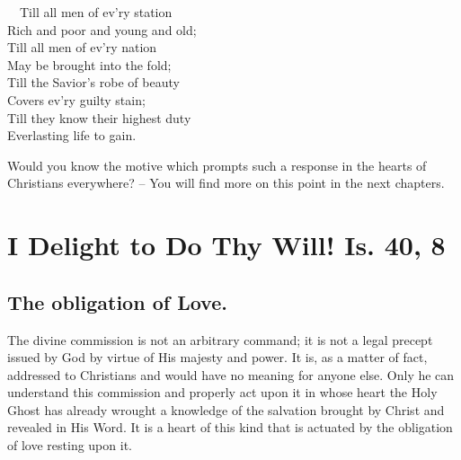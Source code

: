 \documentclass[
]{book}
\begin{document}
~~Till all men of ev'ry station\\
\hspace*{0.333em}\hspace*{0.333em}Rich and poor and young and old;\\
\hspace*{0.333em}\hspace*{0.333em}Till all men of ev'ry nation\\
\hspace*{0.333em}\hspace*{0.333em}May be brought into the fold;\\
\hspace*{0.333em}\hspace*{0.333em}Till the Savior's robe of beauty\\
\hspace*{0.333em}\hspace*{0.333em}Covers ev'ry guilty stain;\\
\hspace*{0.333em}\hspace*{0.333em}Till they know their highest duty\\
\hspace*{0.333em}\hspace*{0.333em}Everlasting life to gain.

Would you know the motive which prompts such a response in the hearts of Christians everywhere? -- You will find more on this point in the next chapters.

\hypertarget{i-delight-to-do-thy-will-is.-40-8}{%
\chapter{I Delight to Do Thy Will! Is. 40, 8}\label{i-delight-to-do-thy-will-is.-40-8}}

\hypertarget{the-obligation-of-love.}{%
\section*{The obligation of Love.}\label{the-obligation-of-love.}}

The divine commission is not an arbitrary command; it is not a legal precept issued by God by virtue of His majesty and power. It is, as a matter of fact, addressed to Christians and would have no meaning for anyone else. Only he can understand this commission and properly act upon it in whose heart the Holy Ghost has already wrought a knowledge of the salvation brought by Christ and revealed in His Word. It is a heart of this kind that is actuated by the obligation of love resting upon it.
\end{document}
